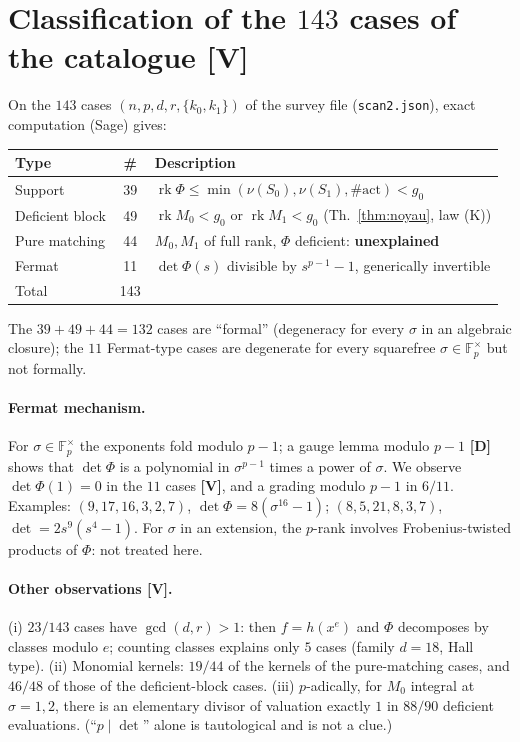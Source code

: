 \documentclass[11pt,a4paper]{article}
\newcommand{\F}{\mathbb{F}}
\begin{document}
\section{Classification of the $143$ cases of the catalogue \textbf{[V]}}
\label{sec:classif}

On the $143$ cases $(n,p,d,r,\{k_0,k_1\})$ of the survey file
(\texttt{scan2.json}), exact computation (Sage) gives:
\begin{center}
\begin{tabular}{lcl}
Type & \# & Description\\\hline
Support & 39 & $\operatorname{rk}\Phi\le\min(\nu(S_0),\nu(S_1),\#\mathrm{act})<g_0$\\
Deficient block & 49 & $\operatorname{rk}M_0<g_0$ or $\operatorname{rk}M_1<g_0$ (Th.~\ref{thm:noyau}, law (K))\\
Pure matching & 44 & $M_0,M_1$ of full rank, $\Phi$ deficient: \textbf{unexplained}\\
Fermat & 11 & $\det\Phi(s)$ divisible by $s^{p-1}-1$, generically invertible\\\hline
Total & 143 &
\end{tabular}
\end{center}
The $39+49+44=132$ cases are ``formal'' (degeneracy for every $\sigma$ in an
algebraic closure); the $11$ Fermat-type cases are degenerate for every squarefree
$\sigma\in\F_p^\times$ but not formally.

\paragraph{Fermat mechanism.} For $\sigma\in\F_p^\times$ the exponents fold
modulo $p-1$; a gauge lemma modulo $p-1$ \textbf{[D]} shows that $\det\Phi$ is a
polynomial in $\sigma^{p-1}$ times a power of $\sigma$. We observe
$\det\Phi(1)=0$ in the $11$ cases \textbf{[V]}, and a grading modulo $p-1$ in
$6/11$. Examples: $(9,17,16,3,2,7)$, $\det\Phi=8(\sigma^{16}-1)$;
$(8,5,21,8,3,7)$, $\det=2s^9(s^4-1)$. For $\sigma$ in an extension, the $p$-rank
involves Frobenius-twisted products of $\Phi$: not treated here.

\paragraph{Other observations \textbf{[V]}.}
(i) $23/143$ cases have $\gcd(d,r)>1$: then $f=h(x^e)$ and $\Phi$ decomposes by
classes modulo $e$; counting classes explains only $5$ cases (family $d=18$,
Hall type). (ii) Monomial kernels: $19/44$ of the kernels of the pure-matching
cases, and $46/48$ of those of the deficient-block cases. (iii) $p$-adically,
for $M_0$ integral at $\sigma=1,2$, there is an elementary divisor of valuation
exactly $1$ in $88/90$ deficient evaluations. (``$p\mid\det$'' alone is
tautological and is not a clue.)
\end{document}
